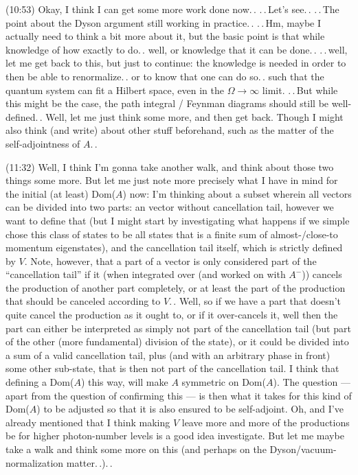 \documentclass{report}
\begin{document}
(10:53) Okay, I think I can get some more work done now.\,. .\,.\,Let's see.\,. .\,.\,The point about the Dyson argument still working in practice.\,. .\,.\,Hm, maybe I actually need to think a bit more about it, but the basic point is that while knowledge of how exactly to do.\,. well, or knowledge that it can be done.\,. .\,.\,well, let me get back to this, but just to continue: the knowledge is needed in order to then be able to renormalize.\,. or to know that one can do so.\,. such that the quantum system can fit a Hilbert space, even in the $\Omega\to\infty$ limit. .\,.\,But while this might be the case, the path integral / Feynman diagrams should still be well-defined.\,. Well, let me just think some more, and then get back. Though I might also think (and write) about other stuff beforehand, such as the matter of the self-adjointness of $A$.\,. %

(11:32) Well, I think I'm gonna take another walk, and think about those two things some more. But let me just note more precisely what I have in mind for the initial (at least) Dom($A$) now: I'm thinking about a subset wherein all vectors can be divided into two parts: an vector without cancellation tail, however we want to define that (but I might start by investigating what happens if we simple chose this class of states to be all states that is a finite sum of almost-/close-to momentum eigenstates), and the cancellation tail itself, which is strictly defined by $V$. Note, however, that a part of a vector is only considered part of the ``cancellation tail'' if it (when integrated over (and worked on with $A^-$)) cancels the production of another part completely, or at least the part of the production that should be canceled according to $V$.\,. Well, so if we have a part that doesn't quite cancel the production as it ought to, or if it over-cancels it, well then the part can either be interpreted as simply not part of the cancellation tail (but part of the other (more fundamental) division of the state), or it could be divided into a sum of a valid cancellation tail, plus (and with an arbitrary phase in front) some other sub-state, that is then not part of the cancellation tail. I think that defining a Dom($A$) this way, will make $A$ symmetric on Dom($A$). The question --- apart from the question of confirming this --- is then what it takes for this kind of Dom($A$) to be adjusted so that it is also ensured to be self-adjoint. Oh, and I've already mentioned that I think making $V$ leave more and more of the productions be for higher photon-number levels is a good idea investigate. But let me maybe take a walk and think some more on this (and perhaps on the Dyson/vacuum-normalization matter.\,.).\,. %
\end{document}

